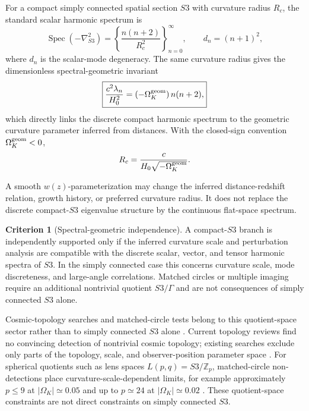\documentclass[11pt,a4paper]{article}
\def\Sthree{S3}%
\numberwithin{equation}{section}
\theoremstyle{definition}
\newtheorem{criterion}{Criterion}
\theoremstyle{plain}
\theoremstyle{remark}
\newcommand{\Sthree}{S^3}
\begin{document}
For a compact simply connected spatial section \(\Sthree\) with curvature radius \(R_c\), the standard scalar harmonic spectrum is \cite{HalliwellHawking1985,KodamaSasaki1984}
\begin{equation}
\operatorname{Spec}(-\nabla^2_{\Sthree})
=
\left\{
\frac{n(n+2)}{R_c^2}
\right\}_{n=0}^{\infty},
\qquad
 d_n=(n+1)^2,
\end{equation}
where \(d_n\) is the scalar-mode degeneracy.
The same curvature radius gives the dimensionless spectral-geometric invariant
\begin{equation}
\boxed{
\frac{c^2\lambda_n}{H_0^2}
=(-\Omega_K^{\rm geom})\,n(n+2),
}
\end{equation}
which directly links the discrete compact harmonic spectrum to the geometric curvature parameter inferred from distances. With the closed-sign convention \(\Omega_K^{\rm geom}<0\),
\begin{equation}
R_c=\frac{c}{H_0\sqrt{-\Omega_K^{\rm geom}}}.
\end{equation}

A smooth \(w(z)\)-parameterization may change the inferred distance-redshift relation, growth history, or preferred curvature radius. It does not replace the discrete compact-\(\Sthree\) eigenvalue structure by the continuous flat-space spectrum.

\begin{criterion}[Spectral-geometric independence]
A compact-\(\Sthree\) branch is independently supported only if the inferred curvature scale and perturbation analysis are compatible with the discrete scalar, vector, and tensor harmonic spectra of \(\Sthree\). In the simply connected case this concerns curvature scale, mode discreteness, and large-angle correlations. Matched circles or multiple imaging require an additional nontrivial quotient \(\Sthree/\Gamma\) and are not consequences of simply connected \(\Sthree\) alone.
\end{criterion}

Cosmic-topology searches and matched-circle tests belong to this quotient-space sector rather than to simply connected \(\Sthree\) alone \cite{CornishSpergelStarkman1998,LuminetEtAl2003,Planck2016Topology,CosmicTopologyReview2026}. Current topology reviews find no convincing detection of nontrivial cosmic topology; existing searches exclude only parts of the topology, scale, and observer-position parameter space \cite{CosmicTopologyReview2026}. For spherical quotients such as lens spaces \(L(p,q)=\Sthree/\mathbb Z_p\), matched-circle non-detections place curvature-scale-dependent limits, for example approximately \(p\le9\) at \(|\Omega_K|\simeq0.05\) and up to \(p\simeq24\) at \(|\Omega_K|\simeq0.02\) \cite{COMPACTLensSpaces2025}. These quotient-space constraints are not direct constraints on simply connected \(\Sthree\).
\end{document}
